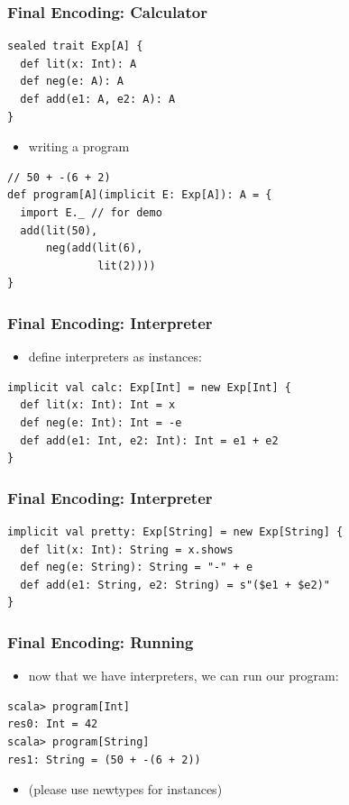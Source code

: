 \documentclass{beamer}
\begin{document}
\begin{frame}[fragile]
  \frametitle{Final Encoding: Calculator}
\begin{verbatim}
sealed trait Exp[A] {
  def lit(x: Int): A
  def neg(e: A): A
  def add(e1: A, e2: A): A
}
\end{verbatim}
  \begin{itemize}
  \item writing a program
  \end{itemize}
\begin{verbatim}
// 50 + -(6 + 2)
def program[A](implicit E: Exp[A]): A = {
  import E._ // for demo
  add(lit(50),
      neg(add(lit(6),
              lit(2))))
}
\end{verbatim}
\end{frame}

\begin{frame}[fragile]
  \frametitle{Final Encoding: Interpreter}
  \begin{itemize}
  \item define interpreters as instances:
  \end{itemize}
\begin{verbatim}
implicit val calc: Exp[Int] = new Exp[Int] {
  def lit(x: Int): Int = x
  def neg(e: Int): Int = -e
  def add(e1: Int, e2: Int): Int = e1 + e2
}
\end{verbatim}
\end{frame}

\begin{frame}[fragile]
  \frametitle{Final Encoding: Interpreter}
  \begin{verbatim}
implicit val pretty: Exp[String] = new Exp[String] {
  def lit(x: Int): String = x.shows
  def neg(e: String): String = "-" + e
  def add(e1: String, e2: String) = s"($e1 + $e2)"
}
\end{verbatim}
\end{frame}

\begin{frame}[fragile]
  \frametitle{Final Encoding: Running}
  \begin{itemize}
  \item now that we have interpreters, we can run our program:
  \end{itemize}
\begin{verbatim}
scala> program[Int]
res0: Int = 42
scala> program[String]
res1: String = (50 + -(6 + 2))
\end{verbatim}
  \begin{itemize}
  \item (please use newtypes for instances)
  \end{itemize}
\end{frame}
\end{document}
